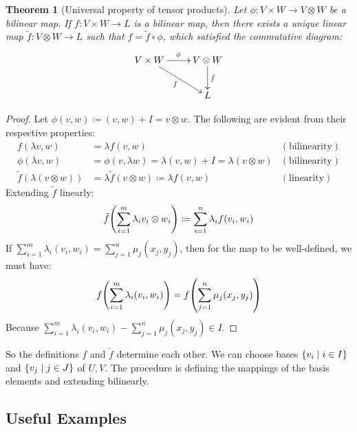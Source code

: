 \documentclass[svgnames]{article}
\newtheorem{Theorem}{Theorem}
\theoremstyle{definition}
\theoremstyle{remark}
\theoremstyle{underline}
\theoremstyle{underline}
\begin{document}
	\begin{Theorem}[Universal property of tensor products]
		Let $\phi \colon V \times W \to V \otimes W$ be a bilinear map. If $f \colon V \times W \to L$ is a bilinear map, then there exists a unique linear map $\tilde f \colon V \otimes W \to L$ such that $f = \tilde f \circ \phi $, which satisfied the commutative diagram:
		\begin{gather*}
		\xymatrix{
		V \times W \ar[r]^{\phi} \ar[rd]_{f} & V \otimes W \ar[d]^{\tilde f} \\
		& L
		}
		\end{gather*}
	\end{Theorem}

	\begin{proof}
		Let $\phi(v,w) \coloneqq {(v,w) + I} = {v \otimes w}$. The following are evident from their respective properties:
		\begin{align*}
	    	f(\lambda v, w) & = \lambda f(v,w) & (\text{bilinearity}) \\
	  		\phi(\lambda v, w) & = \phi(v,\lambda w) = \lambda(v, w) + I = \lambda(v \otimes w) & (\text{bilinearity}) \\
	    	\tilde f(\lambda (v\otimes w)) & = \lambda\tilde f(v\otimes w) \coloneqq \lambda f(v,w) & (\text{linearity})
	    \end{align*}
		Extending $\tilde f$ linearly:
		\begin{gather*}
			\tilde f\pqty{\sum_{i=1}^m \lambda_i v_i \otimes w_i } \coloneqq \sum_{i = 1}^n \lambda_i f\pqty{v_i, w_i}
		\end{gather*}
		If $\sum_{i=1}^m \lambda_i (v_i,w_i) = \sum_{j=1}^n \mu_j (x_j,y_j)$, then for the map to be well-defined, we must have:
		\begin{gather*}
			f\pqty{\sum_{i=1}^m \lambda_i (v_i,w_i)} = f\pqty{\sum_{j=1}^n \mu_j (x_j,y_j)} 
		\end{gather*}
		Because $\sum_{i=1}^m \lambda_i (v_i,w_i) - \sum_{j=1}^n \mu_j (x_j,y_j) \in I$.
	\end{proof}

	So the definitions $f$ and $\tilde f$ determine each other. We can choose bases $\qty{v_i \mid i \in I}$ and $\qty{v_j \mid j \in J}$ of $U, V$. The procedure is defining the mappings of the basis elements and extending bilinearly.  

	\subsection{Useful Examples}
\end{document}
